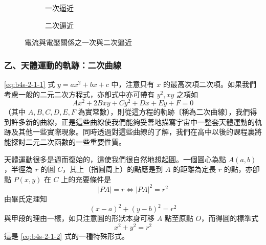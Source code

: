 \begin{figure}[H]
\centering
\begin{subfigure}[b]{0.45\textwidth}
\centering
{}
\caption{一次逼近}
\end{subfigure}
\hfill
\begin{subfigure}[b]{0.45\textwidth}
\centering
{}
\caption{二次逼近}
\end{subfigure}
\caption{電流與電壓關係之一次與二次逼近}
\label{fig:b4s-2-1-4}
\end{figure}

\subsubsection*{乙、天體運動的軌跡：二次曲線}

\eqref{eq:b4s-2-1-1} 式 $y = ax^2 + bx + c$ 中，注意只有 $x$ 的最高次項二次項。如果我們考慮一般的二元二次方程式，亦卽式中亦可帶有 $y^2, xy$ 之項如
\begin{equation}
Ax^2 + 2Bxy + Cy^2 + Dx + Ey + F = 0 \label{eq:b4s-2-1-2}
\end{equation}
（其中 $A, B, C, D, E, F$ 為實常數），則從這方程的軌跡〔稱為二次曲線〕，我們得到許多新的曲線，正是這些曲線使我們能夠妥善地描寫宇宙中一整套天體運動的軌跡及其他一些實際現象。同時透過對這些曲線的了解，我們在高中以後的課程裏將能探討二元二次函數的一些重要性質。

天體運動很多是週而復始的，這使我們很自然地想起圓。一個圓心為點 $A(a, b)$，半徑為 $r$ 的圓 $C$，其上（指圓周上）的點應是到 $A$ 的距離為定長 $r$ 的點，亦卽點 $P(x, y)$ 在 $C$ 上的充要條件是
\[ |PA| = r \iff |PA|^2 = r^2 \]
由畢氏定理知
\begin{equation}
(x - a)^2 + (y - b)^2 = r^2 \label{eq:b4s-2-1-3}
\end{equation}
與甲段的理由一樣，如只注意圓的形狀本身可移 $A$ 點至原點 $O$，而得圓的標準式
\begin{equation}
x^2 + y^2 = r^2 \label{eq:b4s-2-1-4}
\end{equation}
這是 \eqref{eq:b4s-2-1-2} 式的一種特殊形式。

